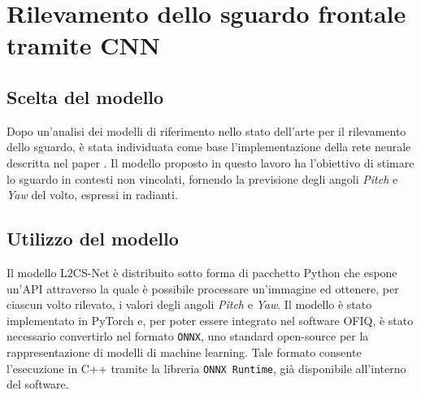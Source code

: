 \documentclass[12pt,a4paper,openright,twoside]{book}
\begin{document}
\chapter{Rilevamento dello sguardo frontale tramite CNN}

\section{Scelta del modello}
Dopo un'analisi dei modelli di riferimento nello stato dell'arte per il rilevamento dello sguardo, è stata individuata come base l'implementazione della rete neurale descritta nel paper \cite[L2CS-NET: Fine-Grained Gaze Estimation in Unconstrained Environments]{10372944}.  
Il modello proposto in questo lavoro ha l'obiettivo di stimare lo sguardo in contesti non vincolati, fornendo la previsione degli angoli \textit{Pitch} e \textit{Yaw} del volto, espressi in radianti.

\section{Utilizzo del modello}
Il modello L2CS-Net è distribuito sotto forma di pacchetto Python che espone un'API attraverso la quale è possibile processare un'immagine ed ottenere, per ciascun volto rilevato, i valori degli angoli \textit{Pitch} e \textit{Yaw}.  
Il modello è stato implementato in PyTorch e, per poter essere integrato nel software OFIQ, è stato necessario convertirlo nel formato \texttt{ONNX}, uno standard open-source per la rappresentazione di modelli di machine learning. Tale formato consente l'esecuzione in C++ tramite la libreria \texttt{ONNX Runtime}, già disponibile all'interno del software.  
\end{document}
